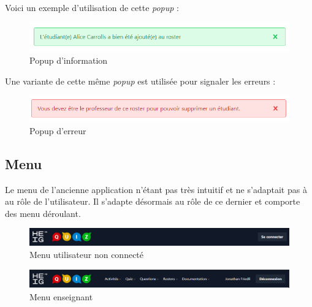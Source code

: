 Voici un exemple d'utilisation de cette \emph{popup} :
\begin{center}
    \begin{figure}[H]
        \includegraphics[width=\textwidth]{./assets/figures/validationPopup.png}
        \caption{Popup d'information}
    \end{figure}
\end{center}

Une variante de cette même \emph{popup} est utilisée pour signaler les erreurs :
\begin{center}
    \begin{figure}[H]
        \includegraphics[width=\textwidth]{./assets/figures/errorPopup.png}
        \caption{Popup d'erreur}
    \end{figure}
\end{center}

\subsection{Menu}
Le menu de l'ancienne application n'étant pas très intuitif et ne s'adaptait pas à au rôle de l'utilisateur. Il s'adapte désormais au rôle de ce dernier et comporte des menu déroulant.

\begin{center}
    \begin{figure}[H]
        \includegraphics[width=\textwidth]{./assets/figures/basicNav.png}
        \caption{Menu utilisateur non connecté}
    \end{figure}
\end{center}

\begin{center}
    \begin{figure}[H]
        \includegraphics[width=\textwidth]{./assets/figures/teacherNav.png}
        \caption{Menu enseignant}
    \end{figure}
\end{center}

